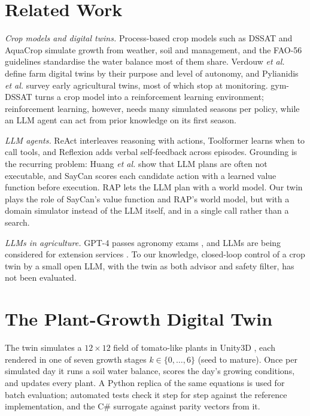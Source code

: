 \documentclass[conference]{IEEEtran}
\begin{document}
\section{Related Work}

\textit{Crop models and digital twins.} Process-based crop models such as DSSAT
\cite{jones2003dssat} and AquaCrop \cite{steduto2009aquacrop} simulate growth from weather,
soil and management, and the FAO-56 guidelines \cite{allen1998fao56} standardise the water
balance most of them share. Verdouw \textit{et al.} \cite{verdouw2021digital} define farm
digital twins by their purpose and level of autonomy, and Pylianidis \textit{et al.}
\cite{pylianidis2021introducing} survey early agricultural twins, most of which stop at
monitoring. gym-DSSAT \cite{gautron2022gymdssat} turns a crop model into a reinforcement
learning environment; reinforcement learning, however, needs many simulated seasons per policy,
while an LLM agent can act from prior knowledge on its first season.

\textit{LLM agents.} ReAct \cite{yao2023react} interleaves reasoning with actions, Toolformer
\cite{schick2023toolformer} learns when to call tools, and Reflexion \cite{shinn2023reflexion}
adds verbal self-feedback across episodes. Grounding is the recurring problem: Huang
\textit{et al.} \cite{huang2022language} show that LLM plans are often not executable, and SayCan
\cite{ahn2022saycan} scores each candidate action with a learned value function before execution.
RAP \cite{hao2023reasoning} lets the LLM plan with a world model. Our twin plays the role of
SayCan's value function and RAP's world model, but with a domain simulator instead of the LLM
itself, and in a single call rather than a search.

\textit{LLMs in agriculture.} GPT-4 passes agronomy exams \cite{silva2023gpt4}, and LLMs are
being considered for extension services \cite{tzachor2023large}. To our knowledge, closed-loop
control of a crop twin by a small open LLM, with the twin as both advisor and safety filter, has
not been evaluated.

\section{The Plant-Growth Digital Twin}\label{sec:twin}

The twin simulates a $12\times12$ field of tomato-like plants in Unity3D \cite{juliani2018unity},
each rendered in one of seven growth stages $k\in\{0,\dots,6\}$ (seed to mature). Once per
simulated day it runs a soil water balance, scores the day's growing conditions, and updates
every plant. A Python replica of the same equations is used for batch evaluation; automated
tests check it step for step against the reference implementation, and the C\# surrogate
against parity vectors from it.
\end{document}
